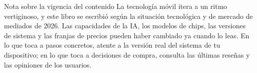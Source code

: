 \begin{tcbwarn}{Nota sobre la vigencia del contenido}
La tecnología móvil itera a un ritmo vertiginoso, y este libro se escribió según la situación tecnológica y de mercado de mediados de 2026. Las capacidades de la IA, los modelos de chips, las versiones de sistema y las franjas de precios pueden haber cambiado ya cuando lo leas. En lo que toca a pasos concretos, atente a la versión real del sistema de tu dispositivo; en lo que toca a decisiones de compra, consulta las últimas reseñas y las opiniones de los usuarios.

\end{tcbwarn}
